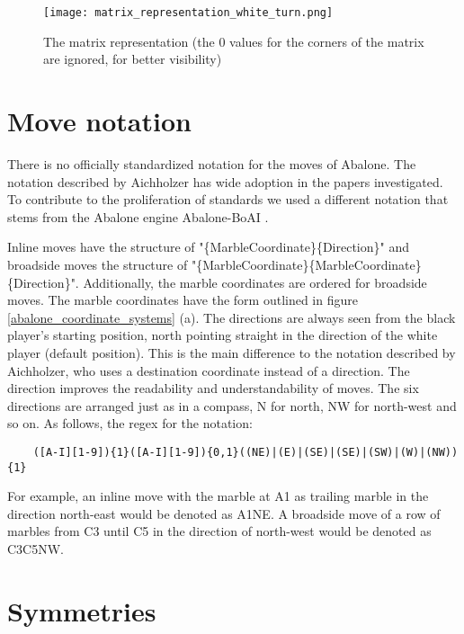 \begin{figure}[!h]
    \centering
    \texttt{[image: matrix\_representation\_white\_turn.png]}
    \caption{The matrix representation (the $0$ values for the corners of the matrix are ignored, for better visibility)}
    \label{abalone_matrix_representation}
\end{figure}

\section{Move notation}
\label{abalone_move_notation}
There is no officially standardized notation for the moves of Abalone. The notation described by Aichholzer \cite{aichholzer_abalone_2006} has wide adoption in the papers investigated. To contribute to the proliferation of standards \cite{xkcd_standards_nodate} we used a different notation that stems from the Abalone engine Abalone-BoAI \cite{scriptim_scriptimabalone-boai_2021}.

Inline moves have the structure of "\{MarbleCoordinate\}\{Direction\}" and broadside moves the structure of "\{MarbleCoordinate\}\{MarbleCoordinate\}\{Direction\}". Additionally, the marble coordinates are ordered for broadside moves. The marble coordinates have the form outlined in figure \ref{abalone_coordinate_systems} (a). The directions are always seen from the black player's starting position, north pointing straight in the direction of the white player (default position). This is the main difference to the notation described by Aichholzer, who uses a destination coordinate instead of a direction. The direction improves the readability and understandability of moves. The six directions are arranged just as in a compass, N for north, NW for north-west and so on. As follows, the regex for the notation:

\begin{BVerbatim}
    ([A-I][1-9]){1}([A-I][1-9]){0,1}((NE)|(E)|(SE)|(SE)|(SW)|(W)|(NW)){1}
\end{BVerbatim}

For example, an inline move with the marble at A1 as trailing marble in the direction north-east would be denoted as A1NE. A broadside move of a row of marbles from C3 until C5 in the direction of north-west would be denoted as C3C5NW.

\section{Symmetries}
\label{abalone_symmetries}


